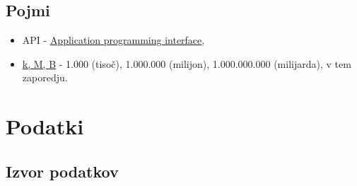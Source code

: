 \documentclass[a4paper,11pt]{article}
\begin{document}
\subsection{Pojmi}
\begin{itemize}
  \item API - \href{http://en.wikipedia.org/wiki/Application_programming_interface}{\underline{Application programming interface}},
  \item \href{http://sl.wikipedia.org/wiki/Predpone_SI}{\underline{k, M, B}} - 1.000 (tisoč), 1.000.000 (milijon), 1.000.000.000 (milijarda), v tem zaporedju.
\end{itemize}

\pagebreak
\section{Podatki}

\subsection{Izvor podatkov}
\end{document}

